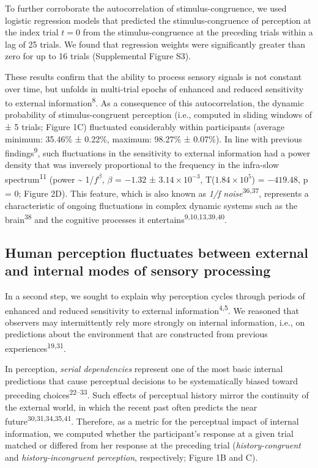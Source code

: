 \documentclass[
]{article}
\begin{document}
To further corroborate the autocorrelation of stimulus-congruence, we
used logistic regression models that predicted the stimulus-congruence
of perception at the index trial \(t = 0\) from the stimulus-congruence
at the preceding trials within a lag of 25 trials. We found that
regression weights were significantly greater than zero for up to 16
trials (Supplemental Figure S3).

These results confirm that the ability to process sensory signals is not
constant over time, but unfolds in multi-trial epochs of enhanced and
reduced sensitivity to external information\textsuperscript{8}. As a
consequence of this autocorrelation, the dynamic probability of
stimulus-congruent perception (i.e., computed in sliding windows of ± 5
trials; Figure 1C) fluctuated considerably within participants (average
minimum: 35.46\% ± 0.22\%, maximum: 98.27\% ± 0.07\%). In line with
previous findings\textsuperscript{9}, such fluctuations in the
sensitivity to external information had a power density that was
inversely proportional to the frequency in the infra-slow
spectrum\textsuperscript{11} (power \textasciitilde{} 1/\(f^\beta\),
\(\beta\) = \(-1.32\) ± \(\ensuremath{3.14\times 10^{-3}}\),
T(\(\ensuremath{1.84\times 10^{5}}\)) = \(-419.48\), p = \(0\); Figure
2D). This feature, which is also known as \emph{1/f
noise}\textsuperscript{36,37}, represents a characteristic of ongoing
fluctuations in complex dynamic systems such as the
brain\textsuperscript{38} and the cognitive processes it
entertains\textsuperscript{9,10,13,39,40}.

\hypertarget{human-perception-fluctuates-between-external-and-internal-modes-of-sensory-processing}{%
\subsection{Human perception fluctuates between external and internal
modes of sensory
processing}\label{human-perception-fluctuates-between-external-and-internal-modes-of-sensory-processing}}

In a second step, we sought to explain why perception cycles through
periods of enhanced and reduced sensitivity to external
information\textsuperscript{4,5}. We reasoned that observers may
intermittently rely more strongly on internal information, i.e., on
predictions about the environment that are constructed from previous
experiences\textsuperscript{19,31}.

In perception, \emph{serial dependencies} represent one of the most
basic internal predictions that cause perceptual decisions to be
systematically biased toward preceding choices\textsuperscript{22--33}.
Such effects of perceptual history mirror the continuity of the external
world, in which the recent past often predicts the near
future\textsuperscript{30,31,34,35,41}. Therefore, as a metric for the
perceptual impact of internal information, we computed whether the
participant's response at a given trial matched or differed from her
response at the preceding trial (\emph{history-congruent} and
\emph{history-incongruent perception}, respectively; Figure 1B and C).
\end{document}

